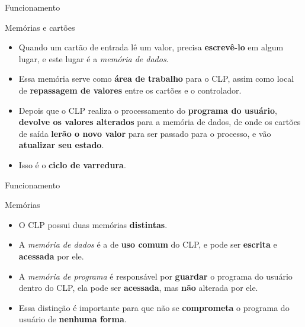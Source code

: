 \begin{frame}{Funcionamento}
	\begin{block}{Memórias e cartões}
		\begin{itemize}
			\item Quando um cartão de entrada lê um valor, precisa \textbf{escrevê-lo} em algum lugar, e este lugar é a \textit{memória de dados}.
			\item Essa memória serve como \textbf{área de trabalho} para o CLP, assim como local de \textbf{repassagem de valores} entre os cartões e o controlador.
			\item Depois que o CLP realiza o processamento do \textbf{programa do usuário}, \textbf{devolve os valores alterados} para a memória de dados, de onde os cartões de saída \textbf{lerão o novo valor} para ser passado para o processo, e vão \textbf{atualizar seu estado}.
			\item Isso é o \textbf{ciclo de varredura}.
		\end{itemize}
	\end{block}
\end{frame}


\begin{frame}{Funcionamento}
	\begin{block}{Memórias}
		\begin{itemize}
			\item O CLP possui duas memórias \textbf{distintas}.
			\item A \textit{memória de dados} é a de \textbf{uso comum} do CLP, e pode ser \textbf{escrita} e \textbf{acessada} por ele.
			\item A \textit{memória de programa} é responsável por \textbf{guardar} o programa do usuário dentro do CLP, ela pode ser \textbf{acessada}, mas \textbf{não} alterada por ele.
			\item Essa distinção é importante para que não se \textbf{comprometa} o programa do usuário de \textbf{nenhuma forma}.
		\end{itemize}
	\end{block}
\end{frame}


